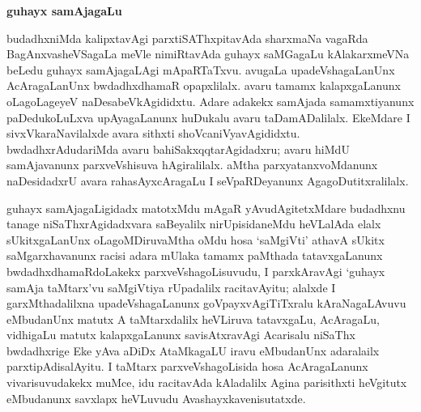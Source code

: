 \smallskip
\begin{center}
{\Large\bf guhayx samAjagaLu}
\end{center}

budadhxniMda kalipxtavAgi parxtiSAThxpitavAda sharxmaNa vagaRda BagAnxvasheVSagaLa meVle nimiRtavAda guhayx saMGagaLu kAlakarxmeVNa beLedu guhayx samAjagaLAgi mApaRTaTxvu. avugaLa upadeVshagaLanUnx AcAragaLanUnx bwdadhxdhamaR opapxlilalx. avaru tamamx kalapxgaLanunx oLagoLageyeV naDesabeVkAgididxtu. Adare adakekx samAjada samamxtiyanunx paDedukoLuLxva upAyagaLanunx huDukalu avaru taDamADalilalx. EkeMdare I sivxVkaraNavilalxde avara sithxti shoVcaniVyavAgididxtu. bwdadhxrAdudariMda avaru bahiSakxqqtarAgidadxru; avaru hiMdU samAjavanunx parxveVshisuva hAgiralilalx. aMtha parxyatanxvoMdanunx naDesidadxrU avara rahasAyxcAragaLu I seVpaRDeyanunx AgagoDutitxralilalx.

\newpage

guhayx samAjagaLigidadx matotxMdu mAgaR yAvudAgitetxMdare budadhxnu tanage niSaThxrAgidadxvara saBeyalilx nirUpisidaneMdu heVLalAda elalx sUkitxgaLanUnx oLagoMDiruvaMtha oMdu hosa `saMgiVti' athavA sUkitx saMgarxhavanunx racisi adara mUlaka tamamx paMthada tatavxgaLanunx bwdadhxdhamaRdoLakekx parxveVshagoLisuvudu, I parxkAravAgi `guhayx samAja taMtarx'vu saMgiVtiya rUpadalilx racitavAyitu; alalxde I garxMthadalilxna upadeVshagaLanunx goVpayxvAgiTiTxralu kAraNagaLAvuvu eMbudanUnx matutx A taMtarxdalilx heVLiruva tatavxgaLu, AcAragaLu, vidhigaLu matutx kalapxgaLanunx savisAtxravAgi Acarisalu niSaThx bwdadhxrige Eke yAva aDiDx AtaMkagaLU iravu eMbudanUnx adaralailx parxtipAdisalAyitu. I taMtarx parxveVshagoLisida hosa AcAragaLanunx vivarisuvudakekx muMce, idu racitavAda kAladalilx Agina parisithxti heVgitutx eMbudanunx savxlapx heVLuvudu Avashayxkavenisutatxde.

